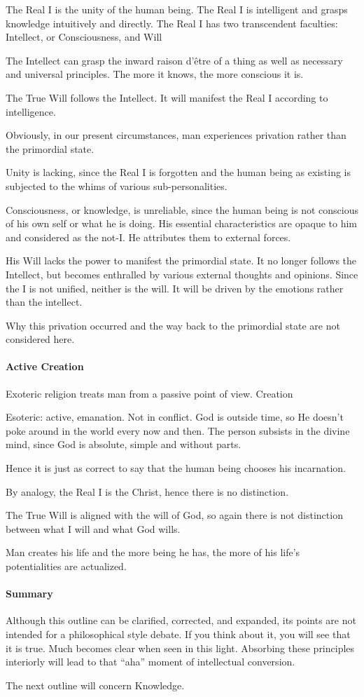 The Real I is the unity of the human being. The Real I is intelligent and grasps knowledge intuitively and directly. The Real I has two transcendent faculties: Intellect, or Consciousness, and Will

The Intellect can grasp the inward raison d’être of a thing as well as necessary and universal principles. The more it knows, the more conscious it is.

The True Will follows the Intellect. It will manifest the Real I according to intelligence.

Obviously, in our present circumstances, man experiences privation rather than the primordial state.

Unity is lacking, since the Real I is forgotten and the human being as existing is subjected to the whims of various sub-personalities.

Consciousness, or knowledge, is unreliable, since the human being is not conscious of his own self or what he is doing. His essential characteristics are opaque to him and considered as the not-I. He attributes them to external forces.

His Will lacks the power to manifest the primordial state. It no longer follows the Intellect, but becomes enthralled by various external thoughts and opinions. Since the I is not unified, neither is the will. It will be driven by the emotions rather than the intellect.

Why this privation occurred and the way back to the primordial state are not considered here.

\paragraph{Active Creation}
Exoteric religion treats man from a passive point of view. Creation

Esoteric: active, emanation. Not in conflict. God is outside time, so He doesn't poke around in the world every now and then. The person subsists in the divine mind, since God is absolute, simple and without parts.

Hence it is just as correct to say that the human being chooses his incarnation.

By analogy, the Real I is the Christ, hence there is no distinction.

The True Will is aligned with the will of God, so again there is not distinction between what I will and what God wills.

Man creates his life and the more being he has, the more of his life's potentialities are actualized.

\paragraph{Summary}
Although this outline can be clarified, corrected, and expanded, its points are not intended for a philosophical style debate. If you think about it, you will see that it is true. Much becomes clear when seen in this light. Absorbing these principles interiorly will lead to that “aha” moment of intellectual conversion.

The next outline will concern Knowledge.

